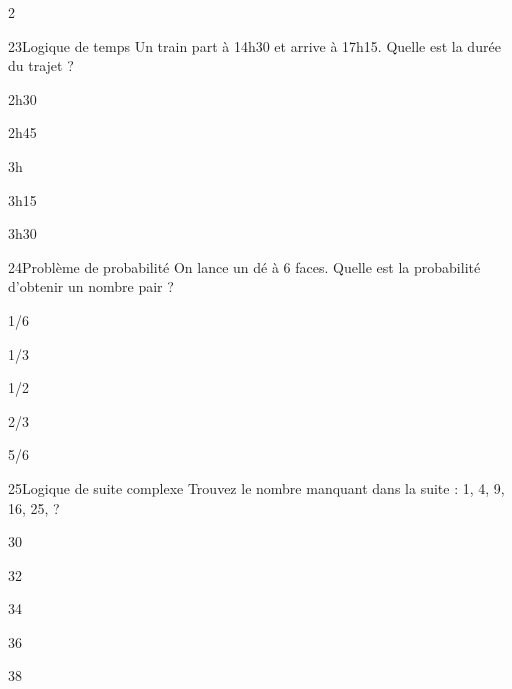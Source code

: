 \begin{multicols}{2}
\begin{question}{23}{Logique de temps}
Un train part à 14h30 et arrive à 17h15. Quelle est la durée du trajet ?
\begin{enumeratebf}
\item 2h30
\item 2h45
\item 3h
\item 3h15
\item 3h30
\end{enumeratebf}
\end{question}

\begin{question}{24}{Problème de probabilité}
On lance un dé à 6 faces. Quelle est la probabilité d’obtenir un nombre pair ?
\begin{enumeratebf}
\item 1/6
\item 1/3
\item 1/2
\item 2/3
\item 5/6
\end{enumeratebf}
\end{question}

\begin{question}{25}{Logique de suite complexe}
Trouvez le nombre manquant dans la suite : 1, 4, 9, 16, 25, ?
\begin{enumeratebf}
\item 30
\item 32
\item 34
\item 36
\item 38
\end{enumeratebf}
\end{question}





\end{multicols}
